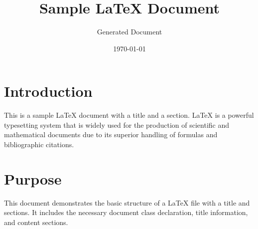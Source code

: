 \documentclass{article}
\title{Sample LaTeX Document}
\author{Generated Document}
\date{\today}
\begin{document}
\maketitle

\section{Introduction}
This is a sample LaTeX document with a title and a section. LaTeX is a powerful typesetting system that is widely used for the production of scientific and mathematical documents due to its superior handling of formulas and bibliographic citations.

\section{Purpose}
This document demonstrates the basic structure of a LaTeX file with a title and sections. It includes the necessary document class declaration, title information, and content sections.
\end{document}
